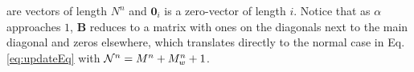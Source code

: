 are vectors of length $N^n$ and $\boldsymbol{0}_i$ is a zero-vector of length $i$.
%
%
Notice that as $\alpha$ approaches $1$, $\mathbf{B}$ reduces to a matrix with ones on the diagonals next to the main diagonal and zeros elsewhere, which translates directly to the normal case in Eq. \eqref{eq:updateEq} with $\mathcal{N}^n = M^n + M_w^n + 1$. 

